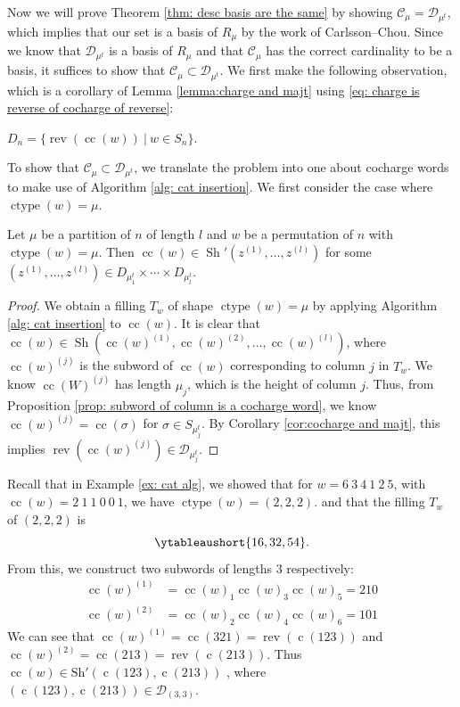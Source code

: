 \documentclass[ALCO, Unicode]{cedram}
\DeclareMathOperator{\ctype}{ctype}
\DeclareMathOperator{\sh}{Sh}
\DeclareMathOperator{\rev}{rev}
\DeclareMathOperator{\cc}{cc}
\DeclareMathOperator{\cw}{c}
\begin{document}
Now we will prove Theorem \ref{thm: desc basis are the same} by showing $\mathcal{C_\mu} = \mathcal{D}_{\mu^t}$, which implies that our set is a basis of $R_{\mu}$ by the work of Carlsson--Chou.
Since we know that $\mathcal{D}_{\mu^t}$ is a basis of $R_{\mu}$ and that $\mathcal{C_\mu}$ has the correct cardinality to be a basis, it suffices to show that $\mathcal{C}_\mu\subset \mathcal{D}_{\mu^t}$.
We first make the following observation, which is a corollary of Lemma \ref{lemma:charge and majt} using \eqref{eq: charge is reverse of cocharge of reverse}:

\begin{coro}\label{cor:cocharge and majt} $D_n = \{\rev(\cc(w)) \ | \ w \in S_n\}.$
\end{coro}

To show that $\mathcal{C}_\mu\subset \mathcal{D}_{\mu^t}$, we translate the problem into one about cocharge words to make use of Algorithm \ref{alg: cat insertion}. We first consider the case where $\ctype(w) = \mu$.

\begin{prop}\label{prop: ctype implies shuffle}
    Let $\mu$ be a partition of $n$ of length $l$ and  $w$ be a permutation of $n$ with $\ctype(w) = \mu$. 
    Then $\cc(w) \in \sh'(z^{(1)},\dots , z^{(l)})$ for some $(z^{(1)},\dots , z^{(l)})\in D_{\mu^t_1}\times \cdots \times D_{\mu^t_l}$.
\end{prop}

\begin{proof}
    We obtain a filling $T_w$ of shape $\ctype(w) = \mu $ by applying Algorithm \ref{alg: cat insertion} to $\cc(w)$.
    It is clear that $\cc(w) \in \sh (\cc(w)^{(1)}, \cc(w)^{(2)}, \dots, \cc(w)^{(l)})$, where $\cc(w)^{(j)}$ is the subword of $\cc(w)$ corresponding to column $j$ in $T_w$. We know $\cc(W)^{(j)}$ has length $\mu_j$, which is the height of column $j$. 
    Thus, from Proposition \ref{prop: subword of column is a cocharge word}, we know $\cc(w)^{(j)} = \cc(\sigma)$ for $\sigma\in S_{\mu^t_j}$. 
    By Corollary \ref{cor:cocharge and majt}, this implies  $\rev(\cc(w)^{(j)}) \in \mathcal{D}_{\mu^t_j}$.
\end{proof}

\begin{ex}\label{ex: cat ex}
    Recall that in Example \ref{ex: cat alg}, we showed that for $w = 6 \ 3 \ 4  \ 1 \ 2\ 5 $, with $\cc(w) = 2 \ 1 \ 1  \ 0 \ 0\ 1 $, we have  $\ctype(w) = (2,2,2).$ and that the filling $T_w$ of $ (2,2,2) $ is 
        \[\ytableaushort{16,32,54}. \] 
    From this, we construct two subwords of lengths $3$ respectively:
    \begin{align*}
        \cc(w)^{(1)} &= \cc(w)_1\cc(w)_3\cc(w)_5 = 210\\
         \cc(w)^{(2)} &= \cc(w)_2\cc(w)_4\cc(w)_6 = 101
    \end{align*}
    We can see that $\cc(w)^{(1)} = \cc(321) = \rev(\cw(123))$ and $\cc(w)^{(2)} = \cc(213) = \rev(\cw(213))$. 
    Thus $\cc(w)\in \text{Sh} '(\cw(123), \cw(213))$ , where $(\cw(123), \cw(213)) \in \mathcal{D}_{(3,3)}$.
\end{ex}
\end{document}
